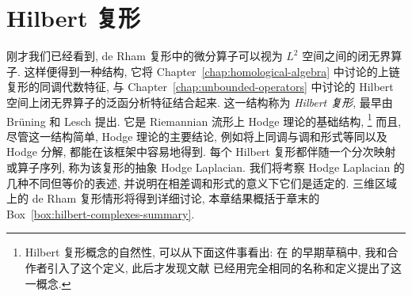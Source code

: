 \clearpage\setcounter{chapter}{3}
\chapter{Hilbert 复形}\label{chap:hilbert-complexes}

刚才我们已经看到, de Rham 复形中的微分算子可以视为 $L^2$ 空间之间的闭无界算子. 这样便得到一种结构, 它将 Chapter~\ref{chap:homological-algebra} 中讨论的上链复形的同调代数特征, 与 Chapter~\ref{chap:unbounded-operators} 中讨论的 Hilbert 空间上闭无界算子的泛函分析特征结合起来. 这一结构称为 \emph{Hilbert 复形}, 最早由 Brüning 和 Lesch  提出. 它是 Riemannian 流形上 Hodge 理论的基础结构,%
\footnote{{Hilbert 复形概念的自然性, 可以从下面这件事看出: 在  的早期草稿中, 我和合作者引入了这个定义, 此后才发现文献  已经用完全相同的名称和定义提出了这一概念.}}%
而且, 尽管这一结构简单, Hodge 理论的主要结论, 例如将上同调与调和形式等同以及 Hodge 分解, 都能在该框架中容易地得到. 每个 Hilbert 复形都伴随一个分次映射或算子序列, 称为该复形的抽象 Hodge Laplacian. 我们将考察 Hodge Laplacian 的几种不同但等价的表述, 并说明在相差调和形式的意义下它们是适定的. 三维区域上的 de Rham 复形情形将得到详细讨论, 本章结果概括于章末的 Box~\ref{box:hilbert-complexes-summary}.
